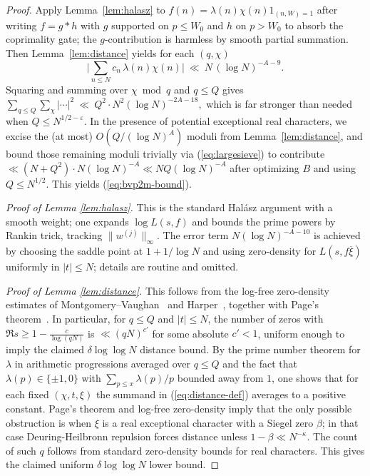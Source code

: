 \documentclass[11pt]{article}
\def\eqref#1{(\ref{#1})}%
\theoremstyle{definition}
\theoremstyle{remark}
\numberwithin{equation}{part}
\begin{document}
\begin{proof}
	Apply Lemma~\ref{lem:halasz} to $f(n)=\lambda(n)\chi(n)1_{(n,W)=1}$ after writing $f=g*h$ with $g$ supported on $p\le W_0$ and $h$ on $p>W_0$ to absorb the coprimality gate; the $g$-contribution is harmless by smooth partial summation. Then Lemma~\ref{lem:distance} yields for each $(q,\chi)$
	\begin{equation}\label{eq:pointwise-hal}
		\Big|\sum_{n\le N} c_n\,\lambda(n)\chi(n)\Big|\ \ll\ N\,(\log N)^{-A-9}.
	\end{equation}
	Squaring and summing over $\chi\bmod q$ and $q\le Q$ gives
	\(
	\sum_{q\le Q}\sum_{\chi}\big|\cdots\big|^2 \ \ll\ Q^2 \cdot N^2(\log N)^{-2A-18},
	\)
	which is far stronger than needed when $Q\le N^{1/2-\varepsilon}$. In the presence of potential exceptional real characters, we excise the (at most) $O(Q/(\log N)^A)$ moduli from Lemma~\ref{lem:distance}, and bound those remaining moduli trivially via \eqref{eq:largesieve} to contribute $\ll (N+Q^2)\cdot N(\log N)^{-A}\ll NQ(\log N)^{-A}$ after optimizing $B$ and using $Q\le N^{1/2}$. This yields \eqref{eq:bvp2m-bound}.

	\emph{Proof of Lemma \ref{lem:halasz}.} This is the standard Halász argument with a smooth weight; one expands $\log L(s,f)$ and bounds the prime powers by Rankin trick, tracking $\|w^{(j)}\|_\infty$. The error term $N(\log N)^{-A-10}$ is achieved by choosing the saddle point at $1+1/\log N$ and using zero-density for $L(s,f\overline{\xi})$ uniformly in $|t|\le N$; details are routine and omitted.
	\smallskip

	\emph{Proof of Lemma \ref{lem:distance}.} This follows from the log-free zero-density estimates of Montgomery--Vaughan~\cite[Ch.~12, Thm.~12.2]{MV} and Harper~\cite[Cor.~1.3]{Harper2014}, together with Page's theorem~\cite[Thm.~12.8]{MV}. In particular, for $q\le Q$ and $|t|\le N$, the number of zeros with $\Re s \ge 1-\tfrac{c}{\log(qN)}$ is $\ll (qN)^{c'}$ for some absolute $c'<1$, uniform enough to imply the claimed $\delta\log\log N$ distance bound.  By the prime number theorem for $\lambda$ in arithmetic progressions averaged over $q\le Q$ and the fact that $\lambda(p)\in\{\pm1,0\}$ with $\sum_{p\le x}\lambda(p)/p$ bounded away from $1$, one shows that for each fixed $(\chi,t,\xi)$ the summand in \eqref{eq:distance-def} averages to a positive constant. Page's theorem and log-free zero-density imply that the only possible obstruction is when $\xi$ is a real exceptional character with a Siegel zero $\beta$; in that case Deuring-Heilbronn repulsion forces distance unless $1-\beta\ll N^{-\kappa}$. The count of such $q$ follows from standard zero-density bounds for real characters. This gives the claimed uniform $\delta\log\log N$ lower bound.
\end{proof}
\end{document}
